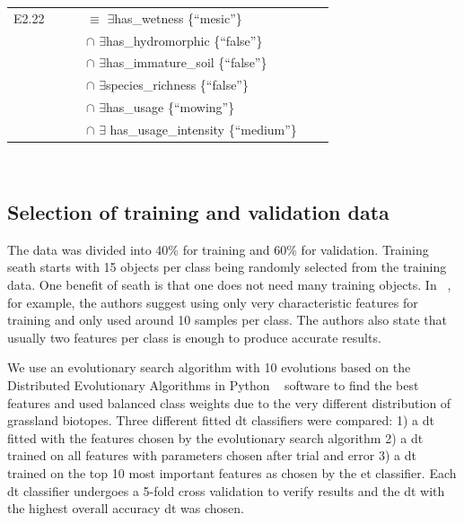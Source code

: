 \documentclass[authoryear,review,12pt,number]{elsarticle}
\begin{document}
\begin{tabular}[h]{p{0.8cm}l p{2cm}l}
    E2.22 &$\qquad$ {} $\equiv$ $\exists$has\_wetness \{``mesic''\} \\
      \ &$\qquad$ {} $\cap$ $\exists$has\_hydromorphic \{``false''\} \\
      \ &$\qquad$ {} $\cap$ $\exists$has\_immature\_soil \{``false''\} \\
     &$\qquad$ {} $\cap$ $\exists$species\_richness \{``false''\} \\
     &$\qquad$ {} $\cap$ $\exists$has\_usage \{``mowing''\} \\
     &$\qquad$ {} $\cap$ $\exists$ has\_usage\_intensity \{``medium''\} \\
\end{tabular}\label{eq:description_logic}\\






\subsection{Selection of training and validation data}
\label{subsec:Selection_of_training_validation_data}
The data was divided into 40\% for training and 60\% for validation. Training 
\gls{seath} starts with 15 objects per class being randomly selected from the 
training data. One benefit of \gls{seath} is that one does not need many 
training objects. In ~\cite{Nussbaum2006}, for example, the authors suggest 
using only very characteristic features for training and only used around 10 
samples per class. The authors also state that usually two features per class 
is enough to produce accurate results.

We use an evolutionary search algorithm with 10 evolutions based on the 
Distributed Evolutionary Algorithms in Python ~\citep{DEAP_JMLR2012} software 
to find the best features and used balanced class weights due to the very 
different distribution of grassland biotopes. Three different fitted \gls{dt} 
classifiers were compared: 1) a \gls{dt} fitted with the features chosen by the 
evolutionary search algorithm 2) a \gls{dt} trained on all features with 
parameters chosen after trial and error 3) a \gls{dt} trained on the top 10 
most important features as chosen by the \gls{et} classifier. Each \gls{dt} 
classifier undergoes a 5-fold cross validation to verify results and the 
\gls{dt} with the highest overall accuracy \gls{dt} was chosen.
\label{subsec:rulegen_data_mining}
\end{document}
